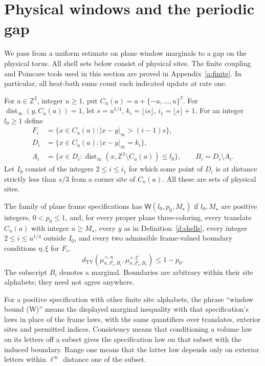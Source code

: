 \section{Physical windows and the periodic gap}
\label{s:periodic-gap}

We pass from a uniform estimate on plane window marginals to a gap on
the physical torus.  All shell sets below consist of physical sites.
The finite coupling and Poincare tools used in this section are proved
in Appendix~\ref{a:finite}.  In particular, all heat-bath sums count
each indicated update at rate one.

\begin{definition}\label{d:shells}
For \(a\in\mathbb Z^2\), integer \(u\ge1\), put
\(C_u(a)=a+\{-u,\ldots,u\}^2\).
For \(\operatorname{dist}_\infty(y,C_u(a))=1\), let
\(s=u^{1/4}\), \(k_i=\lfloor is\rfloor\), \(i_1=\lfloor s\rfloor+1\).
For an integer \(l_0\ge1\) define
\[
 \begin{split}
 F_i&=\{x\in C_u(a):|x-y|_\infty>(i-1)s\},\\
 D_i&=\{x\in C_u(a):|x-y|_\infty=k_i\},\\
 A_i&=\{x\in D_i:\operatorname{dist}_\infty
                    (x,\mathbb Z^2\setminus C_u(a))\le l_0\},\qquad
 B_i=D_i\setminus A_i .
 \end{split}
\]
Let \(I_0\) consist of the integers \(2\le i\le i_1\) for which
some point of \(D_i\) is at distance strictly less than \(s/3\)
from a corner site of \(C_u(a)\).
All these are sets of physical sites.
\end{definition}

\begin{definition}[(W)]\label{d:W}
The family of plane frame specifications has \(\mathsf W(l_0,p_0,M_\star)\)
if \(l_0,M_\star\) are positive integers, \(0<p_0\le1\), and,
for every proper plane three-coloring, every translate \(C_u(a)\)
with integer \(u\ge M_\star\), every \(y\) as in Definition~\ref{d:shells},
every integer \(2\le i\le u^{1/4}\) outside \(I_0\), and every two
admissible frame-valued boundary conditions \(\eta,\xi\) for \(F_i\),
\[
 d_{\mathrm{TV}}\!\left(
       \mu^{+,\eta}_{\kappa,F_i,B_i},
       \mu^{+,\xi}_{\kappa,F_i,B_i}\right)\le1-p_0 .
\]
The subscript \(B_i\) denotes a marginal. Boundaries are arbitrary
within their site alphabets; they need not agree anywhere.
\end{definition}

For a positive specification with other finite site alphabets, the
phrase ``window bound (W)'' means the displayed marginal inequality
with that specification's laws in place of the frame laws, with the
same quantifiers over translates, exterior sites and permitted indices.
Consistency means that conditioning a volume law on its letters off a
subset gives the specification law on that subset with the induced
boundary.  Range one means that the latter law depends only on exterior
letters within \(\ell^\infty\) distance one of the subset.

